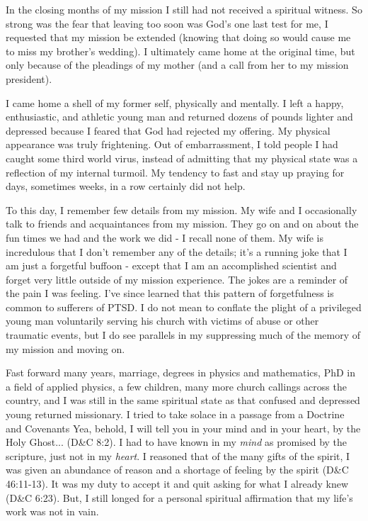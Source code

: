 \documentclass[a4paper]{article}
\begin{document}
In the closing months of my mission I still had not received a spiritual witness.  So strong was the fear that leaving too soon was God's one last test for me, I requested that my mission be extended (knowing that doing so would cause me to miss my brother's wedding).  I ultimately came home at the original time, but only because of the pleadings of my mother (and a call from her to my mission president).

I came home a shell of my former self, physically and mentally.  I left a happy, enthusiastic, and athletic young man and returned dozens of pounds lighter and depressed because I feared that God had rejected my offering.  My physical appearance was truly frightening.  Out of embarrassment, I told people I had caught some third world virus, instead of admitting that my physical state was a reflection of my internal turmoil.  My tendency to fast and stay up praying for days, sometimes weeks, in a row certainly did not help.

To this day, I remember few details from my mission.  My wife and I occasionally talk to friends and acquaintances from my mission.  They go on and on about the fun times we had and the work we did - I recall none of them.  My wife is incredulous that I don't remember any of the details; it's a running joke that I am just a forgetful buffoon - except that I am an accomplished scientist and forget very little outside of my mission experience.  The jokes are a reminder of the pain I was feeling.  I've since learned that this pattern of forgetfulness is common to sufferers of PTSD.  I do not mean to conflate the plight of a privileged young man voluntarily serving his church with victims of abuse or other traumatic events, but I do see parallels in my suppressing much of the memory of my mission and \textquotedbl{}moving on\textquotedbl{}.

Fast forward many years, marriage, degrees in physics and mathematics, PhD in a field of applied physics, a few children, many more church callings across the country, and I was still in the same spiritual state as that confused and depressed young returned missionary.  I tried to take solace in a passage from a Doctrine and Covenants \textquotedbl{}Yea, behold, I will tell you in your mind and in your heart, by the Holy Ghost...\textquotedbl{} (D\&C 8:2).  I had to have known in my \emph{mind} as promised by the scripture, just not in my \emph{heart}.  I reasoned that of the many gifts of the spirit, I was given an abundance of reason and a shortage of feeling by the spirit (D\&C 46:11-13).  It was my duty to accept it and quit asking for what I already knew (D\&C 6:23).  But, I still longed for a personal spiritual affirmation that my life's work was not in vain.
\end{document}
